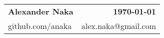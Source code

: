 \begin{tabularx}{\textwidth}{L R}
    \large\textbf{Alexander Naka} & \textbf{\today} \\
    github.com/anaka & alex.naka@gmail.com \\
\end{tabularx}

